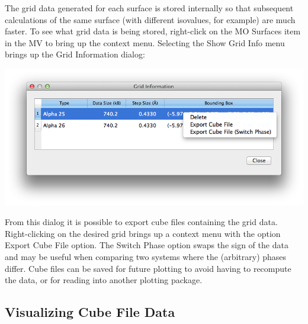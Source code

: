 \documentclass[a4paper,12pt]{article}
\begin{document}
The grid data generated for each surface is stored internally so that
subsequent calculations of the same surface (with different isovalues, for
example) are much faster.  To see what grid data is being stored, right-click
on the MO Surfaces item in the MV to bring up the context menu.  Selecting the
Show Grid Info menu brings up the Grid Information dialog:
\begin{center}
\includegraphics[scale=0.5]{figures/GridInfo.png} \\
\end{center}
From this dialog it is possible to export cube files containing the grid data.
Right-clicking on the desired grid brings up a context menu with the option
Export Cube File option.  The Switch Phase option swaps the sign of the data
and may be useful when comparing two systems where the (arbitrary) phases
differ.  Cube files can be saved for future plotting to avoid having to
recompute the data, or for reading into another plotting package. \\


\subsection{Visualizing Cube File Data}
\end{document}
